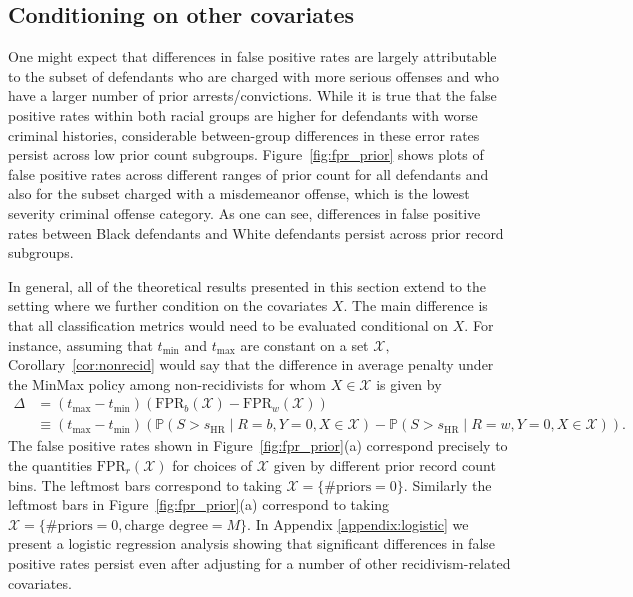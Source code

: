 \documentclass[11pt, svgnames]{article}
\renewcommand{\P}{\mathbb{P}}
\newcommand{\fpr}{\mathrm{FPR}}
\numberwithin{equation}{section}
\theoremstyle{plain}
\theoremstyle{definition}
\numberwithin{prop}{section}
\numberwithin{corollary}{section}
\begin{document}
\subsection{Conditioning on other covariates} \label{sec:covariates}

One might expect that differences in false positive rates are largely attributable to the subset of defendants who are charged with more serious offenses and who have a larger number of prior arrests/convictions.  While it is true that the false positive rates within both racial groups are higher for defendants with worse criminal histories, considerable between-group differences in these error rates persist across low prior count subgroups.  Figure~\ref{fig:fpr_prior} shows plots of false positive rates across different ranges of prior count for all defendants and also for the subset charged with a misdemeanor offense, which is the lowest severity criminal offense category.  As one can see, differences in false positive rates between Black defendants and White defendants persist across prior record subgroups.

In general, all of the theoretical results presented in this section extend to the setting where we further condition on the covariates $X$.  The main difference is that all classification metrics would need to be evaluated conditional on $X$.  For instance, assuming that $t_\mathrm{min}$ and $t_\mathrm{max}$ are constant on a set $\mathcal{X},$ Corollary~\ref{cor:nonrecid} would say that the difference in average penalty under the MinMax policy among non-recidivists for whom $X \in \mathcal{X}$ is given by
%
\begin{align}
\Delta &=  (t_\mathrm{max} - t_\mathrm{min})\left( \fpr_b(\mathcal{X}) - \fpr_w(\mathcal{X}) \right)  \\
&\equiv(t_\mathrm{max} - t_\mathrm{min}) \left( \P(S > s_\mathrm{HR} \mid R = b, Y = 0, X \in \mathcal{X}) - \P(S > s_\mathrm{HR} \mid R = w, Y = 0, X \in \mathcal{X}) \right).
  \label{eq:conditioning}
\end{align}
% 
\indent  The false positive rates shown in Figure~\ref{fig:fpr_prior}(a) correspond precisely to the quantities $\fpr_r(\mathcal{X})$ for choices of $\mathcal{X}$ given by different prior record count bins.  The leftmost bars correspond to taking $\mathcal{X} = \{\# \text{priors} = 0\}$.  Similarly the leftmost bars in Figure~\ref{fig:fpr_prior}(a) correspond to taking $\mathcal{X} = \{\# \text{priors} = 0, \text{charge degree} = M\}$.  In Appendix \ref{appendix:logistic} we present a logistic regression analysis showing that significant differences in false positive rates persist even after adjusting for a number of other recidivism-related covariates.
  
\end{document}
